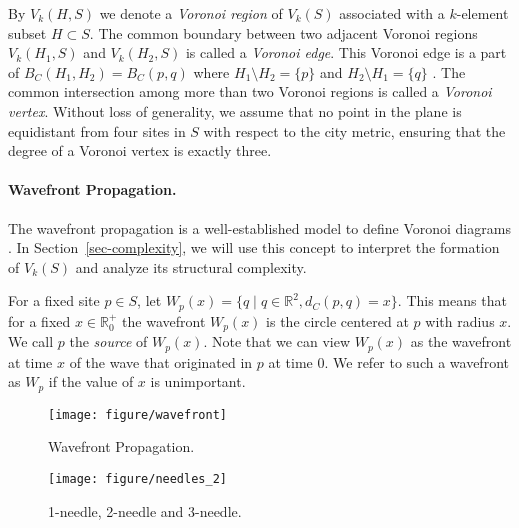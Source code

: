 \documentclass[11pt]{llncs}
\newcommand{\R}{\ensuremath{\mathbb{R}}}
\newcommand{\deleted}[1]{}
\begin{document}
By $V_k(H,S)$ we denote a \emph{Voronoi region} of $V_k(S)$ associated with a $k$-element subset $H\subset S$.
The common boundary between two adjacent Voronoi regions $V_k(H_1, S)$ and $V_k(H_2, S)$
is called a \emph{Voronoi edge}.
This Voronoi edge is a part of $B_C(H_1,H_2)=B_C(p,q)$
where $H_1\setminus H_2=\{p\}$ and $H_2\setminus H_1=\{q\}$ \cite{Lee-82}.
The common intersection among more than two Voronoi regions
is called a \emph{Voronoi vertex}.
Without loss of generality,
we assume that no point in the plane is equidistant from four sites in $S$ with respect to the city metric,
ensuring that the degree of a Voronoi vertex is
exactly three.


\paragraph{\textbf{Wavefront Propagation.}}
The wavefront propagation
is a well-established model to define Voronoi diagrams \cite{AAP-04}.
In Section~\ref{sec-complexity},
we will use this concept to interpret the formation of $V_k(S)$
and analyze its structural complexity.


For a fixed site $p\in S$, let $W_p(x) = \{q \mid q\in \mathbb{R}^2, d_C(p, q)=x\}$.
This means that for a fixed $x \in \R^+_0$ the wavefront $W_p(x)$ is the circle centered at $p$ with radius $x$.
We call $p$ the \emph{source} of $W_p(x)$.
Note that we can view $W_p(x)$ as the wavefront at time $x$ of the wave that originated in $p$ at time 0.
We refer to such a wavefront as $W_p$ if the value of $x$ is unimportant.


\begin{figure}[t]
\begin{center}
\begin{minipage}[b]{0.5\textwidth}
 \centering
 \texttt{[image: figure/wavefront]}
 \caption{Wavefront Propagation.}
 \label{fig-wavefront}
\end{minipage}
\hfill
\begin{minipage}[b]{0.49\textwidth}
 \centering
 \texttt{[image: figure/needles\_2]}
 \caption{ 1-needle, 2-needle and 3-needle. }
 \label{fig-needles}
\end{minipage}
\end{center}
\end{figure}

\deleted{
\begin{figure}[bt]
\centering
\subfigure[]{\texttt{[image: figure/wavefront]}\label{fig-wavefront}}
\subfigure[]{\texttt{[image: figure/needles\_2]}\label{fig-needles}}
\caption{(a) Wavefront Propagation. (b) 1-needle, 2-needle and 3-needle.}
\end{figure}}
\end{document}

